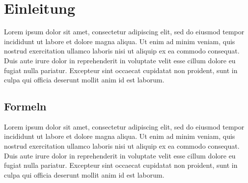 


\renewcommand\title{Wissenschaftliches Arbeiten}
\renewcommand\author{Joe Schwerdtner}
\renewcommand\date{\today}

\newcommand{\street}{Musterstr. 3}
\newcommand{\city}{40477 Düsseldorf}
\newcommand{\mtrnr}{12345678}

\newcommand{\firstexpert}{Prof. Dr. Max Mustermann, Universität Duisburg-Essen}
\newcommand{\secondexpert}{Prof. Dr. Maxine Mustermann, Universität Bamberg}

\newcommand{\submissiondate}{31.03.2020}
\newcommand{\submissionsemester}{Wintersemester 19/20}


    
    \tableofcontents

    \section{Einleitung}
    Lorem ipsum dolor sit amet, consectetur adipiscing elit, sed do eiusmod tempor incididunt ut labore et dolore magna aliqua. Ut enim ad minim veniam, quis nostrud exercitation ullamco laboris nisi ut aliquip ex ea commodo consequat. Duis aute irure dolor in reprehenderit in voluptate velit esse cillum dolore eu fugiat nulla pariatur. Excepteur sint occaecat cupidatat non proident, sunt in culpa qui officia deserunt mollit anim id est laborum.
    \subsection{Formeln}
    Lorem ipsum dolor sit amet, consectetur adipiscing elit, sed do eiusmod tempor incididunt ut labore et dolore magna aliqua. Ut enim ad minim veniam, quis nostrud exercitation ullamco laboris nisi ut aliquip ex ea commodo consequat. Duis aute irure dolor in reprehenderit in voluptate velit esse cillum dolore eu fugiat nulla pariatur. Excepteur sint occaecat cupidatat non proident, sunt in culpa qui officia deserunt mollit anim id est laborum.
